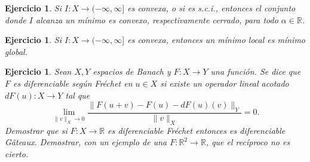 \documentclass{article}
\newcounter{ejer}
\newtheorem{ejercicio}[ejer]{Ejercicio}}
\newcommand{\rr}{\mathbb{R}}
\begin{document}
\begin{ejercicio}  Si $I:X\to (-\infty,\infty]$  es convexa, o si es  s.c.i.,  entonces el conjunto donde $I$ alcanza un mínimo es convexo, respectivamente cerrado, para todo $\alpha\in\rr$.
 \end{ejercicio}

\begin{ejercicio}   Si $I:X\to (-\infty,\infty]$  es convexa, entonces un mínimo local es mínimo global.

\end{ejercicio}


\begin{ejercicio} Sean $X,Y$ espacios de Banach y $F:X\to Y$ una función. Se dice que $F$ es \emph{diferenciable según Fréchet} en $u\in X$ si existe un operador lineal acotado $dF(u):X\to Y$ tal que
\[\lim_{\|v\|_X\to 0}\frac{\|F(u+v)-F(u)-dF(u)(v)\|_Y}{\|v\|_X}=0.\]
Demostrar que si $F:X\to\rr$ es diferenciable Fréchet entonces es diferenciable G\^ateaux. Demostrar, con un ejemplo de una  $F:\rr^2\to\rr$, que el recíproco no es cierto.
\end{ejercicio}
\end{document}
